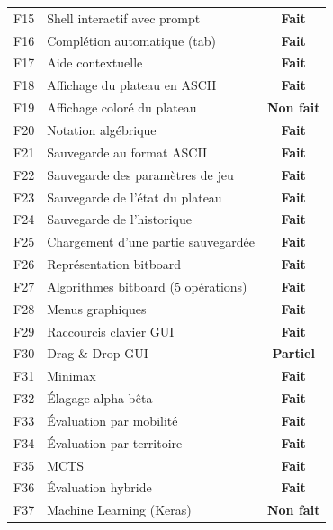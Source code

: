 \documentclass[a4paper]{article}
\providecommand{\midrule}{\hline}
\begin{document}
\begin{longtable}{c p{7cm} c}
\midrule

F15 & Shell interactif avec prompt & \textcolor{fait}{\textbf{Fait}} \\
F16 & Complétion automatique (tab) & \textcolor{fait}{\textbf{Fait}} \\
F17 & Aide contextuelle & \textcolor{fait}{\textbf{Fait}} \\
F18 & Affichage du plateau en ASCII & \textcolor{fait}{\textbf{Fait}} \\
F19 & Affichage coloré du plateau & \textcolor{nonfait}{\textbf{Non fait}} \\
F20 & Notation algébrique & \textcolor{fait}{\textbf{Fait}} \\

\midrule

F21 & Sauvegarde au format ASCII & \textcolor{fait}{\textbf{Fait}} \\
F22 & Sauvegarde des paramètres de jeu & \textcolor{fait}{\textbf{Fait}} \\
F23 & Sauvegarde de l'état du plateau & \textcolor{fait}{\textbf{Fait}} \\
F24 & Sauvegarde de l'historique & \textcolor{fait}{\textbf{Fait}} \\
F25 & Chargement d'une partie sauvegardée & \textcolor{fait}{\textbf{Fait}} \\

\midrule

F26 & Représentation bitboard & \textcolor{fait}{\textbf{Fait}} \\
F27 & Algorithmes bitboard (5 opérations) & \textcolor{fait}{\textbf{Fait}} \\

\midrule

F28 & Menus graphiques & \textcolor{fait}{\textbf{Fait}} \\
F29 & Raccourcis clavier GUI & \textcolor{fait}{\textbf{Fait}} \\
F30 & Drag \& Drop GUI & \textcolor{partiel}{\textbf{Partiel}} \\

\midrule

F31 & Minimax & \textcolor{fait}{\textbf{Fait}} \\
F32 & Élagage alpha-bêta & \textcolor{fait}{\textbf{Fait}} \\
F33 & Évaluation par mobilité & \textcolor{fait}{\textbf{Fait}} \\
F34 & Évaluation par territoire & \textcolor{fait}{\textbf{Fait}} \\
F35 & MCTS & \textcolor{fait}{\textbf{Fait}} \\
F36 & Évaluation hybride & \textcolor{fait}{\textbf{Fait}} \\
F37 & Machine Learning (Keras) & \textcolor{nonfait}{\textbf{Non fait}} \\


\end{longtable}
\end{document}
